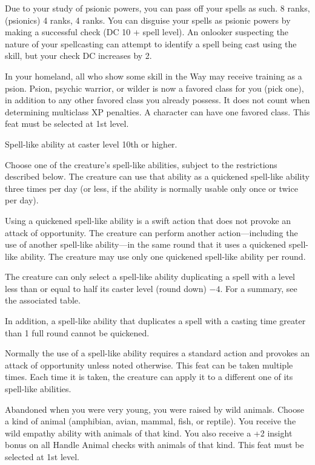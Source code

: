{Due to your study of psionic powers, you can pass off your spells as such.}
{ 8 ranks,  (psionics) 4 ranks,  4 ranks.}
{You can disguise your spells as psionic powers by making a successful  check (DC 10 + spell level). An onlooker suspecting the nature of your spellcasting can attempt to identify a spell being cast using the  skill, but your check DC increases by 2.}{}{}

{In your homeland, all who show some skill in the Way may receive training as a psion.}{}
{Psion, psychic warrior, or wilder is now a favored class for you (pick one), in addition to any other favored class you already possess. It does not count when determining multiclass XP penalties.}
{A character can have one favored class.}
{This feat must be selected at 1st level.}

{}
{Spell-like ability at caster level 10th or higher.}
{Choose one of the creature's spell-like abilities, subject to the restrictions described below. The creature can use that ability as a quickened spell-like ability three times per day (or less, if the ability is normally usable only once or twice per day).

Using a quickened spell-like ability is a swift action that does not provoke an attack of opportunity. The creature can perform another action---including the use of another spell-like ability---in the same round that it uses a quickened spell-like ability. The creature may use only one quickened spell-like ability per round.

The creature can only select a spell-like ability duplicating a spell with a level less than or equal to half its caster level (round down) $-4$. For a summary, see the associated table.

In addition, a spell-like ability that duplicates a spell with a casting time greater than 1 full round cannot be quickened.}
{Normally the use of a spell-like ability requires a standard action and provokes an attack of opportunity unless noted otherwise.}
{This feat can be taken multiple times. Each time it is taken, the creature can apply it to a different one of its spell-like abilities.}

{Abandoned when you were very young, you were raised by wild animals.}{}
{Choose a kind of animal (amphibian, avian, mammal, fish, or reptile). You receive the wild empathy ability with animals of that kind. You also receive a +2 insight bonus on all Handle Animal checks with animals of that kind.}{}
{This feat must be selected at 1st level.}

